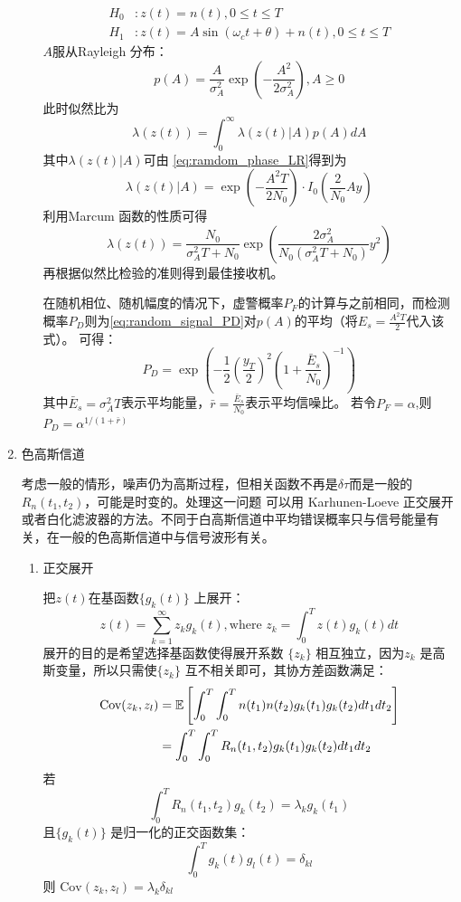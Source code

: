 \documentclass{article}
\def\E{\mathbb{E}}
\def\Cov{\textrm{Cov}}
\begin{document}
\begin{enumerate}
\begin{enumerate}[label=(\alph*)]
\begin{align*}
H_0 & :  z(t)=n(t),0\leq t\leq T \\
H_1 & :  z(t)=A\sin(\omega_c t +\theta)+n(t), 0 \leq t \leq T
\end{align*}
$A$服从Rayleigh 分布：
$$
p(A)=\frac{A}{\sigma_A^2}\exp\left(-\frac{A^2}{2\sigma_A^2}\right),A \geq 0
$$
此时似然比为
$$
\lambda(z(t)) = \int_{0}^{\infty} \lambda(z(t) | A)p(A)dA
$$
其中$\lambda(z(t) |A)$可由 \eqref{eq:ramdom_phase_LR}得到为
$$
\lambda (z(t) | A) = \exp\left(-\frac{A^2 T}{2N_0}\right) \cdot I_0(\frac{2}{N_0}Ay)
$$
利用Marcum 函数的性质可得
$$
\lambda(z(t)) = \frac{N_0}{\sigma_A^2 T + N_0} \exp\left( \frac{2\sigma_A^2}{N_0(\sigma_A^2 T + N_0)}y^2 \right)
$$
再根据似然比检验的准则得到最佳接收机。

在随机相位、随机幅度的情况下，虚警概率$P_F$的计算与之前相同，而检测概率$P_D$则为\eqref{eq:random_signal_PD}对$p(A)$的平均（将$E_s=\frac{A^2 T}{2}$代入该式）。
可得：
\begin{equation}
P_D = \exp\left( -\frac{1}{2} \left(\frac{y_T}{2}\right)^2 \left(1+\frac{\bar{E}_s}{N_0}\right)^{-1}\right)
\end{equation}
其中$\bar{E}_s=\sigma_A^2 T$表示平均能量，$\bar{r}=\frac{\bar{E}_s}{N_0}$表示平均信噪比。
若令$P_F=\alpha$,则$P_D = \alpha^{1/(1+\bar{r})}$
\end{enumerate}
\item 色高斯信道

考虑一般的情形，噪声仍为高斯过程，但相关函数不再是$\delta{\tau}$而是一般的$R_n(t_1,t_2)$，可能是时变的。处理这一问题
可以用 Karhunen-Loeve 正交展开或者白化滤波器的方法。不同于白高斯信道中平均错误概率只与信号能量有关，在一般的色高斯信道中与信号波形有关。
\begin{enumerate}[label=(\alph*)]
\item 正交展开

把$z(t)$在基函数$\{g_k(t)\}$ 上展开：
\begin{equation}\label{eq:ztk}
z(t)= \sum_{k=1}^{\infty} z_k g_k(t), \text{where } z_k = \int_0^T z(t)g_k(t)dt
\end{equation}
展开的目的是希望选择基函数使得展开系数 $\{z_k\}$ 相互独立，因为$z_k$ 是高斯变量，所以只需使$\{z_k\}$ 互不相关即可，其协方差函数满足：
\begin{align}\notag
\Cov(z_k,z_l) & = \E\left[\int_0^T\int_0^T n(t_1)n(t_2)g_k(t_1)g_k(t_2)dt_1dt_2\right] \\
               & = \int_0^T\int_0^T R_n(t_1,t_2)g_k(t_1)g_k(t_2)dt_1dt_2
\end{align}
若
\begin{equation}
\int_0^T R_n(t_1,t_2)g_k(t_2)=\lambda_k g_k(t_1)
\end{equation}
且$\{g_k(t)\}$ 是归一化的正交函数集：
$$
\int_0^T g_k(t)g_l(t) = \delta_{kl}
$$
则 $\Cov(z_k,z_l)=\lambda_k \delta_{kl}$


\end{enumerate}
\end{enumerate}
\end{document}
